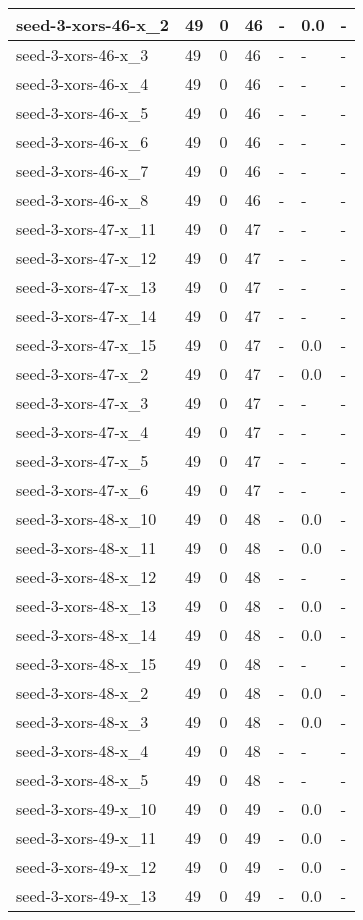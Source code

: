 \begin{scriptsize}
\begin{longtable}{|p{5cm}|l|l|l|l|l|l|}
seed-3-xors-46-x\_2&49&0&46&-&0.0&- \\ \hline 
seed-3-xors-46-x\_3&49&0&46&-&-&- \\ \hline 
seed-3-xors-46-x\_4&49&0&46&-&-&- \\ \hline 
seed-3-xors-46-x\_5&49&0&46&-&-&- \\ \hline 
seed-3-xors-46-x\_6&49&0&46&-&-&- \\ \hline 
seed-3-xors-46-x\_7&49&0&46&-&-&- \\ \hline 
seed-3-xors-46-x\_8&49&0&46&-&-&- \\ \hline 
seed-3-xors-47-x\_11&49&0&47&-&-&- \\ \hline 
seed-3-xors-47-x\_12&49&0&47&-&-&- \\ \hline 
seed-3-xors-47-x\_13&49&0&47&-&-&- \\ \hline 
seed-3-xors-47-x\_14&49&0&47&-&-&- \\ \hline 
seed-3-xors-47-x\_15&49&0&47&-&0.0&- \\ \hline 
seed-3-xors-47-x\_2&49&0&47&-&0.0&- \\ \hline 
seed-3-xors-47-x\_3&49&0&47&-&-&- \\ \hline 
seed-3-xors-47-x\_4&49&0&47&-&-&- \\ \hline 
seed-3-xors-47-x\_5&49&0&47&-&-&- \\ \hline 
seed-3-xors-47-x\_6&49&0&47&-&-&- \\ \hline 
seed-3-xors-48-x\_10&49&0&48&-&0.0&- \\ \hline 
seed-3-xors-48-x\_11&49&0&48&-&0.0&- \\ \hline 
seed-3-xors-48-x\_12&49&0&48&-&-&- \\ \hline 
seed-3-xors-48-x\_13&49&0&48&-&0.0&- \\ \hline 
seed-3-xors-48-x\_14&49&0&48&-&0.0&- \\ \hline 
seed-3-xors-48-x\_15&49&0&48&-&-&- \\ \hline 
seed-3-xors-48-x\_2&49&0&48&-&0.0&- \\ \hline 
seed-3-xors-48-x\_3&49&0&48&-&0.0&- \\ \hline 
seed-3-xors-48-x\_4&49&0&48&-&-&- \\ \hline 
seed-3-xors-48-x\_5&49&0&48&-&-&- \\ \hline 
seed-3-xors-49-x\_10&49&0&49&-&0.0&- \\ \hline 
seed-3-xors-49-x\_11&49&0&49&-&0.0&- \\ \hline 
seed-3-xors-49-x\_12&49&0&49&-&0.0&- \\ \hline 
seed-3-xors-49-x\_13&49&0&49&-&0.0&- \\ \hline 

\end{longtable}
\end{scriptsize}
